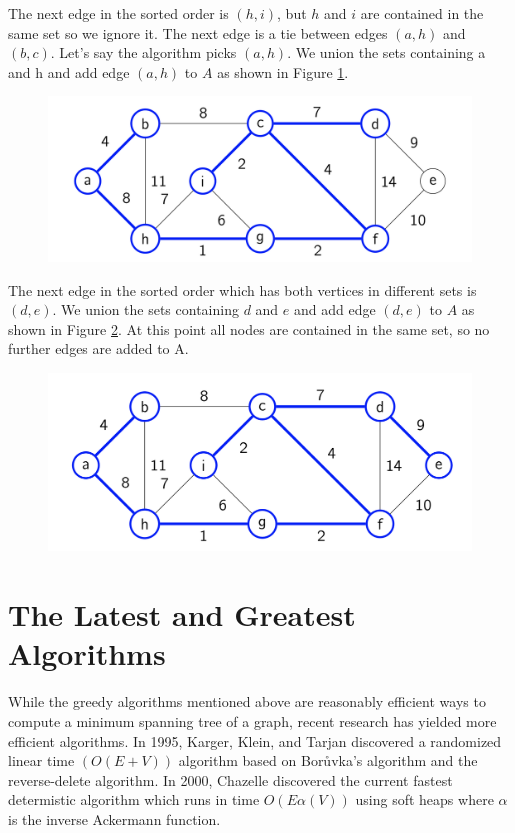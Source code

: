 \documentclass [12pt]{article}
\theoremstyle{definition}
\begin{document}
The next edge in the sorted order is $(h, i)$, but $h$ and $i$ are contained in the same set so we ignore it. The next edge is a tie between edges $(a, h)$ and $(b, c)$. Let’s say the algorithm picks $(a, h)$. We union the sets containing a and h and add edge $(a, h)$ to $A$ as shown in Figure \ref{fig:kruskal7}.


\begin{figure}[h!]
\centering
\includegraphics[scale=0.8]{kruskal7.png}
\caption{}
\label{fig:kruskal7}
\end{figure}

The next edge in the sorted order which has both vertices in different sets is $(d, e)$. We union the sets containing $ d$ and $e$ and add edge $(d, e)$ to $A$ as shown in Figure \ref{fig:kruskal8}. At this point all nodes are contained in the same set, so no further edges are added to A.


\begin{figure}[h!]
\centering
\includegraphics[scale=0.8]{kruskal8.png}
\caption{}
\label{fig:kruskal8}
\end{figure}


\section{The Latest and Greatest Algorithms}
 
While the greedy algorithms mentioned above are reasonably efficient ways to compute a minimum spanning tree of a graph, recent research has yielded more efficient algorithms. In 1995, Karger, Klein, and Tarjan discovered a randomized linear time $(O(E + V ))$ algorithm based on Borůvka's algorithm and the reverse-delete algorithm. In 2000, Chazelle discovered the current fastest determistic algorithm which runs in time $O(E \alpha(V ))$ using soft heaps where $\alpha$ is the inverse Ackermann function.
\end{document}
